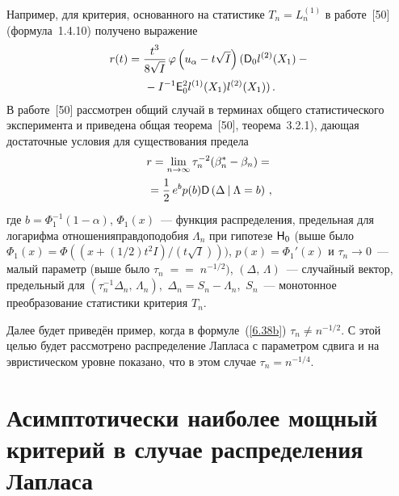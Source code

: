 \begin{multicols}{2}
Например, для критерия, основанного на статистике
$T_n =L_n^{(1)}$ в работе~[50] (формула~1.4.10) получено
выражение
\begin{multline*}
r(t) =\displaystyle\frac{\displaystyle t^3\mathstrut}{\displaystyle 8\sqrt{I}\mathstrut}\,\varphi\left (u_{\alpha}-t\sqrt{I}\right )
({{\sf D}}_0l^{(2)}(X_1)-{}\\
{}-I^{-1}{{\sf E}}_0^2l^{(1)}(X_1)l^{(2)}(X_1))\,.
\end{multline*}
В работе~[50] рассмотрен общий случай в терминах общего
статистического эксперимента и приведена общая теорема~[50],
теорема~3.2.1), дающая достаточные условия для существования
предела
\begin{multline}
r = \lim_{n\to\infty}\tau_n^{-2}(\beta_n^* -
\beta_n) ={}\\
{}= \displaystyle\frac{\displaystyle 1\mathstrut}{\displaystyle 2\mathstrut}\,e^bp(b){{\sf D}}\left (\Delta\:|\:\Lambda = b\right )\,,
\label{6.38b}
\end{multline}
где
$b = \Phi_1^{-1}(1-\alpha)$,
$\Phi_1(x)$~--- функция распре\-де\-ления, предельная для логарифма
отношения\linebreak правдоподобия $\Lambda_n$ при гипотезе ${\sf H}_0$ (выше
было $\Phi_1(x)=\Phi((x+(1/2)t^2I)/(t\sqrt{I})))$,
$p(x) = \Phi_1'(x)$ и $\tau_n\to 0$~--- малый параметр (выше было
$\tau_n\;=$\linebreak $=\;n^{-1/2})$, $(\Delta,\,\Lambda)$~--- случайный
вектор, предельный для $(\tau_n^{-1}\Delta_n,\,\Lambda_n)$,\
$\Delta_n = S_n - \Lambda_n$,\  $S_n$~--- монотонное
преобразование статистики критерия $T_n$.

Далее  будет приведён пример, когда в формуле~(\ref{6.38b})
$\tau_n\ne n^{-1/2}$. С этой целью будет рассмотрено
распределение Лапласа с параметром сдвига и на эвристическом уровне
показано, что в этом случае $\tau_n = n^{-1/4}$.

\vspace*{-6pt}

\section{Асимптотически наиболее мощный критерий в случае
распределения Лапласа}


\end{multicols}
